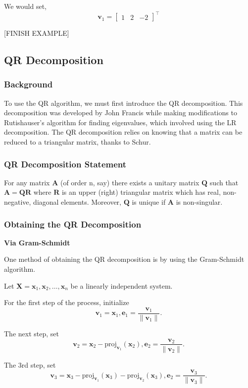 \documentclass[onecolumn]{webofc}
\begin{document}
We would set, $$\mathbf{v}_1 = \begin{bmatrix} 1 & 2 & -2 \end{bmatrix}^{\top}$$

[FINISH EXAMPLE]


\subsection{QR Decomposition}
\subsubsection*{Background}
To use the QR algorithm, we must first introduce the QR decomposition. This decomposition was developed by John Francis while making modifications to Rutishauser's algorithm for finding eigenvalues, which involved using the LR decomposition. The QR decomposition relies on knowing that a matrix can be reduced to a triangular matrix, thanks to Schur. 

\subsubsection*{QR Decomposition Statement}
For any matrix $\mathbf{A}$ (of order n, say) there exists a unitary matrix $\mathbf{Q}$ such that $\mathbf{A} = \mathbf{QR}$ where $\mathbf{R}$ is an upper (right) triangular matrix which has real, non-negative, diagonal elements. Moreover, $\mathbf{Q}$ is unique if $\mathbf{A}$ is non-singular.

\subsubsection*{Obtaining the QR Decomposition}
\textbf{Via Gram-Schmidt}

One method of obtaining the QR decomposition is by using the Gram-Schmidt algorithm. 

Let $\mathbf{X} = \mathbf{x}_1, \mathbf{x}_2, \ldots, \mathbf{x}_n$ be a linearly independent system.

For the first step of the process, initialize $$\mathbf{v}_1= \mathbf{x}_1, \mathbf{e}_1 = \frac{\mathbf{v}_1}{\|\mathbf{v}_1\|}.$$

The next step, set $$\mathbf{v}_2 = \mathbf{x}_2 - \text{proj}_{\mathbf{v}_1}(\mathbf{x}_2), \mathbf{e}_2 = \frac{\mathbf{v}_2}{\|\mathbf{v}_2\|}.$$

The 3rd step, set $$\mathbf{v}_3 = \mathbf{x}_3 - \text{proj}_{\mathbf{v}_1}(\mathbf{x}_3) - \text{proj}_{\mathbf{v}_2}(\mathbf{x}_3), \mathbf{e}_2 = \frac{\mathbf{v}_3}{\|\mathbf{v}_3\|}.$$
\end{document}

